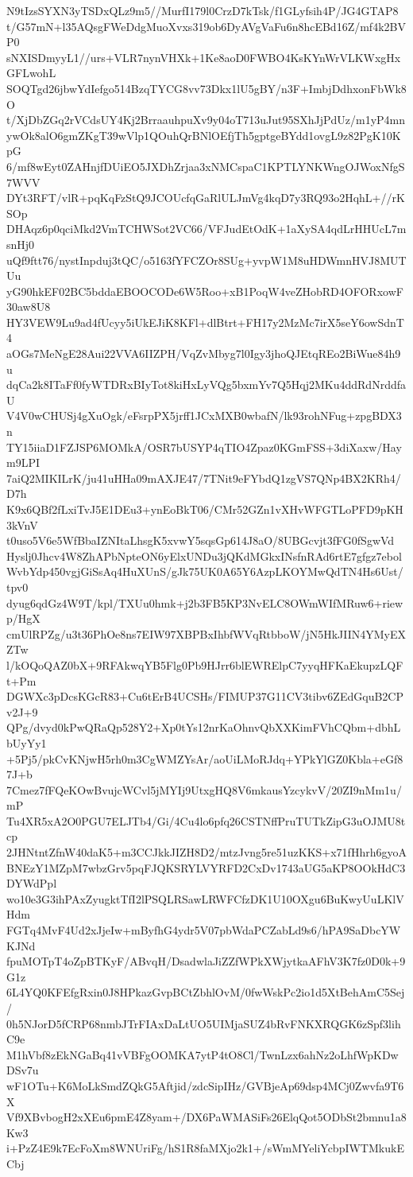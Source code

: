 N9tIzsSYXN3yTSDxQLz9m5//MurfI179l0CrzD7kTsk/f1GLyfsih4P/JG4GTAP8
t/G57mN+l35AQsgFWeDdgMuoXvxs319ob6DyAVgVaFu6n8hcEBd16Z/mf4k2BVP0
sNXISDmyyL1//urs+VLR7nynVHXk+1Ke8aoD0FWBO4KsKYnWrVLKWxgHxGFLwohL
SOQTgd26jbwYdIefgo514BzqTYCG8vv73Dkx1lU5gBY/n3F+ImbjDdhxonFbWk8O
t/XjDbZGq2rVCdsUY4Kj2BrraauhpuXv9y04oT713uJut95SXhJjPdUz/m1yP4mn
ywOk8alO6gmZKgT39wVlp1QOuhQrBNlOEfjTh5gptgeBYdd1ovgL9z82PgK10KpG
6/mf8wEyt0ZAHnjfDUiEO5JXDhZrjaa3xNMCspaC1KPTLYNKWngOJWoxNfgS7WVV
DYt3RFT/vlR+pqKqFzStQ9JCOUcfqGaRlULJmVg4kqD7y3RQ93o2HqhL+//rKSOp
DHAqz6p0qciMkd2VmTCHWSot2VC66/VFJudEtOdK+1aXySA4qdLrHHUcL7msnHj0
uQf9ftt76/nystInpduj3tQC/o5163fYFCZOr8SUg+yvpW1M8uHDWmnHVJ8MUTUu
yG90hkEF02BC5bddaEBOOCODe6W5Roo+xB1PoqW4veZHobRD4OFORxowF30aw8U8
HY3VEW9Lu9ad4fUcyy5iUkEJiK8KFl+dlBtrt+FH17y2MzMc7irX5seY6owSdnT4
aOGs7MeNgE28Aui22VVA6IIZPH/VqZvMbyg7l0Igy3jhoQJEtqREo2BiWue84h9u
dqCa2k8ITaFf0fyWTDRxBIyTot8kiHxLyVQg5bxmYv7Q5Hqj2MKu4ddRdNrddfaU
V4V0wCHUSj4gXuOgk/eFsrpPX5jrff1JCxMXB0wbafN/lk93rohNFug+zpgBDX3n
TY15iiaD1FZJSP6MOMkA/OSR7bUSYP4qTIO4Zpaz0KGmFSS+3diXaxw/Haym9LPI
7aiQ2MIKILrK/ju41uHHa09mAXJE47/7TNit9eFYbdQ1zgVS7QNp4BX2KRh4/D7h
K9x6QBf2fLxiTvJ5E1DEu3+ynEoBkT06/CMr52GZn1vXHvWFGTLoPFD9pKH3kVnV
t0uso5V6e5WfBbaIZNItaLhsgK5xvwY5sqsGp614J8aO/8UBGcvjt3fFG0fSgwVd
Hyslj0Jhcv4W8ZhAPbNpteON6yElxUNDu3jQKdMGkxINsfnRAd6rtE7gfgz7ebol
WvbYdp450vgjGiSsAq4HuXUnS/gJk75UK0A65Y6AzpLKOYMwQdTN4Hs6Ust/tpv0
dyug6qdGz4W9T/kpl/TXUu0hmk+j2b3FB5KP3NvELC8OWmWIfMRuw6+riewp/HgX
cmUlRPZg/u3t36PhOe8ns7EIW97XBPBxIhbfWVqRtbboW/jN5HkJIIN4YMyEXZTw
l/kOQoQAZ0bX+9RFAkwqYB5Flg0Pb9HJrr6blEWRElpC7yyqHFKaEkupzLQFt+Pm
DGWXc3pDcsKGcR83+Cu6tErB4UCSHs/FIMUP37G11CV3tibv6ZEdGquB2CPv2J+9
QPg/dvyd0kPwQRaQp528Y2+Xp0tYs12nrKaOhnvQbXXKimFVhCQbm+dbhLbUyYy1
+5Pj5/pkCvKNjwH5rh0m3CgWMZYsAr/aoUiLMoRJdq+YPkYlGZ0Kbla+eGf87J+b
7Cmez7fFQeKOwBvujcWCvl5jMYIj9UtxgHQ8V6mkausYzcykvV/20ZI9nMm1u/mP
Tu4XR5xA2O0PGU7ELJTb4/Gi/4Cu4lo6pfq26CSTNffPruTUTkZipG3uOJMU8tcp
2JHNtntZfnW40daK5+m3CCJkkJIZH8D2/mtzJvng5re51uzKKS+x71fHhrh6gyoA
BNEzY1MZpM7wbzGrv5pqFJQKSRYLVYRFD2CxDv1743aUG5aKP8OOkHdC3DYWdPpl
wo10e3G3ihPAxZyugktTfI2lPSQLRSawLRWFCfzDK1U10OXgu6BuKwyUuLKlVHdm
FGTq4MvF4Ud2xJjeIw+mByfhG4ydr5V07pbWdaPCZabLd9s6/hPA9SaDbcYWKJNd
fpuMOTpT4oZpBTKyF/ABvqH/DsadwlaJiZZfWPkXWjytkaAFhV3K7fz0D0k+9G1z
6L4YQ0KFEfgRxin0J8HPkazGvpBCtZbhlOvM/0fwWskPc2io1d5XtBehAmC5Sej/
0h5NJorD5fCRP68nmbJTrFIAxDaLtUO5UIMjaSUZ4bRvFNKXRQGK6zSpf3lihC9e
M1hVbf8zEkNGaBq41vVBFgOOMKA7ytP4tO8Cl/TwnLzx6ahNz2oLhfWpKDwDSv7u
wF1OTu+K6MoLkSmdZQkG5Aftjid/zdcSipIHz/GVBjeAp69dsp4MCj0Zwvfa9T6X
Vf9XBvbogH2xXEu6pmE4Z8yam+/DX6PaWMASiFs26ElqQot5ODbSt2bmnu1a8Kw3
i+PzZ4E9k7EcFoXm8WNUriFg/hS1R8faMXjo2k1+/sWmMYeliYcbpIWTMkukECbj
